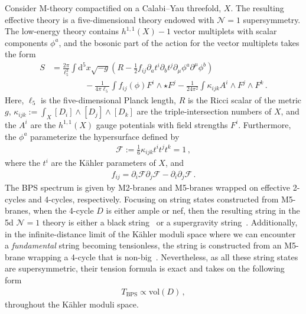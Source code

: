 \documentclass[11pt,dvipsnames]{article}
\theoremstyle{definition}
\newcommand{\cN}{\mathcal{N}}
\begin{document}
Consider M-theory compactified on a Calabi--Yau threefold, $X$. The resulting effective theory is a five-dimensional theory endowed with $\mathcal{N}=1$ supersymmetry. The low-energy theory contains $h^{1,1}(X)-1$ vector multiplets with scalar components $\phi^a$, and the bosonic part of the action for the vector multiplets takes the form
\begin{equation}
    \begin{aligned}
        S &= \frac{2\pi}{\ell_5^3} \int \text{d}^5 x \sqrt{-g} \left(R - \frac{1}{2} f_{ij}  \partial_a t^i \partial_b t^j \partial_\mu \phi^a \partial^\mu \phi^b \right) \\
        &\qquad\qquad -\frac{1}{4\pi \ell_5} \int f_{ij}(\phi) F^i \wedge \star F^j-\frac{1}{24 \pi^2} \int \kappa_{ijk} A^i \wedge F^j \wedge F^k\,.
    \end{aligned}
\end{equation}
Here, $\ell_5$ is the five-dimensional Planck length, $R$ is the Ricci scalar of the metric $g$, $\kappa_{ijk}:=\int_X[D_i]\wedge [D_j]\wedge [D_k]$ are the triple-intersection numbers of $X$, and the $A^i$ are the $h^{1,1}(X)$ gauge potentials with field strengths $F^i$. Furthermore, the $\phi^a$ parameterize the hypersurface defined by
\begin{align}
   \mathcal{F} := \frac{1}{6} \kappa_{ijk} t^i t^j t^k =1\,,
\end{align}
where the $t^i$ are the K\"ahler parameters of $X$, and
\begin{align}
    f_{ij} = \partial_i \mathcal{F} \partial_j \mathcal{F} - \partial_i \partial_j \mathcal{F}\,.
\end{align}
The BPS spectrum is given by M2-branes and M5-branes wrapped on effective 2-cycles and 4-cycles, respectively. Focusing on string states constructed from M5-branes, when the 4-cycle $D$ is either ample or nef, then the resulting string in the 5d $\cN=1$ theory is either a black string~\cite{Maldacena:1997de} or a supergravity string~\cite{Katz:2020ewz}. Additionally, in the infinite-distance limit of the K\"ahler moduli space where we can encounter a \textit{fundamental} string becoming tensionless, the string is constructed from an M5-brane wrapping a 4-cycle that is non-big~\cite{Lee:2019wij}. Nevertheless, as all these string states are supersymmetric, their tension formula is exact and takes on the following form
\begin{align}
    T_{\text{BPS}} \propto \text{vol}(D)\,,
\end{align}
throughout the K\"ahler moduli space.
\end{document}
